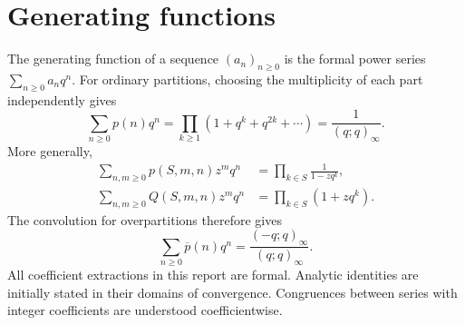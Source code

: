 \section{Generating functions}
The generating function of a sequence $(a_n)_{n\ge0}$ is the formal power
series $\sum_{n\ge0}a_nq^n$. For ordinary partitions, choosing the
multiplicity of each part independently gives
\begin{equation}\label{eq:partition-gf}
 \sum_{n\ge0}p(n)q^n
 =\prod_{k\ge1}(1+q^k+q^{2k}+\cdots)
 =\frac1{(q;q)_\infty}.
\end{equation}
More generally,
\begin{align*}
 \sum_{n,m\ge0}p(S,m,n)z^mq^n&=\prod_{k\in S}\frac1{1-zq^k},\\
 \sum_{n,m\ge0}Q(S,m,n)z^mq^n&=\prod_{k\in S}(1+zq^k).
\end{align*}
The convolution for overpartitions therefore gives
\[
 \sum_{n\ge0}\overline p(n)q^n
 =\frac{(-q;q)_\infty}{(q;q)_\infty}.
\]
All coefficient extractions in this report are formal. Analytic identities
are initially stated in their domains of convergence. Congruences between
series with integer coefficients are understood coefficientwise.
